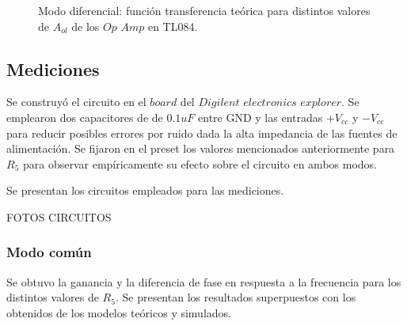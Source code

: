 \begin{figure}[H]
    \centering
    \hfill
    \caption{Modo diferencial: función transferencia teórica para distintos valores de $A_{ol}$ de los $Op$ $Amp$ en TL084.}
  \end{figure}

\subsection{Mediciones}

Se construyó el circuito en el $board$ del $Digilent$ $electronics$ $explorer$. Se emplearon dos capacitores de  de $0.1uF$ entre GND y las entradas $+V_{cc}$ y $-V_{cc}$ para reducir posibles errores por ruido dada la alta impedancia de las fuentes de alimentación. Se fijaron en el preset los valores mencionados anteriormente para $R_{5}$ para observar empíricamente su efecto sobre el circuito en ambos modos. 

Se presentan los circuitos empleados para las mediciones.

FOTOS CIRCUITOS

\subsubsection{Modo común}

Se obtuvo la ganancia y la diferencia de fase en respuesta a la frecuencia para los distintos valores de $R_{5}$. Se presentan los resultados superpuestos con los obtenidos de los modelos teóricos y simulados.

